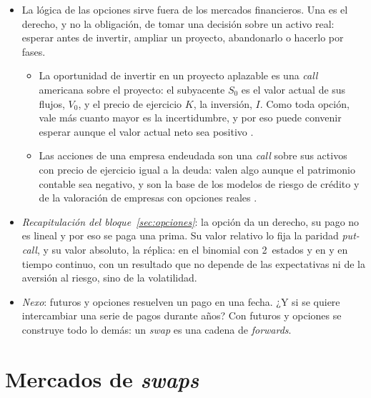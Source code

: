 \documentclass[11pt]{article}
\begin{document}
\begin{itemize}
\item La lógica de las opciones sirve fuera de los mercados financieros. Una  es el derecho, y no la obligación, de tomar una decisión sobre un activo real: esperar antes de invertir, ampliar un proyecto, abandonarlo o hacerlo por fases.
  \begin{itemize}
  \item La oportunidad de invertir en un proyecto aplazable es una \emph{call} americana sobre el proyecto: el subyacente $S_0$ es el valor actual de sus flujos, $V_0$, y el precio de ejercicio $K$, la inversión, $I$. Como toda opción, vale más cuanto mayor es la incertidumbre, y por eso puede convenir esperar aunque el valor actual neto sea positivo  .
  \item Las acciones de una empresa endeudada son una \emph{call} sobre sus activos con precio de ejercicio igual a la deuda\nocite{Merton1974Pricing}: valen algo aunque el patrimonio contable sea negativo, y son la base de los modelos de riesgo de crédito y de la valoración de empresas con opciones reales .
  \end{itemize}
\end{itemize}

\begin{itemize}
\item \emph{Recapitulación del bloque~\ref{sec:opciones}}: la opción da un derecho, su pago no es lineal y por eso se paga una prima. Su valor relativo lo fija la paridad \emph{put-call}, y su valor absoluto, la réplica: en el binomial con 2~estados y en  y  en tiempo continuo, con un resultado que no depende de las expectativas ni de la aversión al riesgo, sino de la volatilidad.
\item \emph{Nexo}: futuros y opciones resuelven un pago en una fecha. ¿Y si se quiere intercambiar una serie de pagos durante años? Con futuros y opciones se construye todo lo demás: un \emph{swap} es una cadena de \emph{forwards}.
\end{itemize}

\section{Mercados de \emph{swaps}}\label{sec:swaps}
\end{document}
